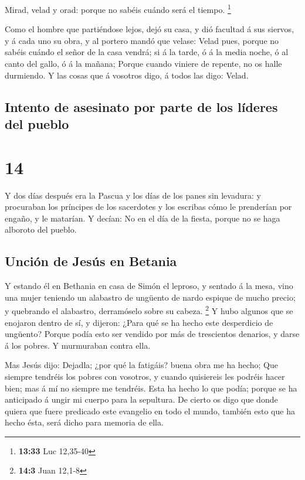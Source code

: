  Mirad, velad y orad: porque no sabéis cuándo será el
tiempo. \footnote{\textbf{13:33} Luc 12,35-40}

 Como el hombre que partiéndose lejos, dejó su casa, y
dió facultad á sus siervos, y á cada uno su obra, y al portero mandó que
velase:  Velad pues, porque no sabéis cuándo el señor de
la casa vendrá; si á la tarde, ó á la media noche, ó al canto del gallo,
ó á la mañana;  Porque cuando viniere de repente, no os
halle durmiendo.  Y las cosas que á vosotros digo, á
todos las digo: Velad.

\hypertarget{intento-de-asesinato-por-parte-de-los-luxedderes-del-pueblo}{%
\subsection{Intento de asesinato por parte de los líderes del
pueblo}\label{intento-de-asesinato-por-parte-de-los-luxedderes-del-pueblo}}

\hypertarget{section-13}{%
\section{14}\label{section-13}}

 Y dos días después era la Pascua y los días de los panes
sin levadura: y procuraban los príncipes de los sacerdotes y los
escribas cómo le prenderían por engaño, y le matarían.  Y
decían: No en el día de la fiesta, porque no se haga alboroto del
pueblo.

\hypertarget{unciuxf3n-de-jesuxfas-en-betania}{%
\subsection{Unción de Jesús en
Betania}\label{unciuxf3n-de-jesuxfas-en-betania}}

 Y estando él en Bethania en casa de Simón el leproso, y
sentado á la mesa, vino una mujer teniendo un alabastro de ungüento de
nardo espique de mucho precio; y quebrando el alabastro, derramóselo
sobre su cabeza. \footnote{\textbf{14:3} Juan 12,1-8}  Y
hubo algunos que se enojaron dentro de sí, y dijeron: ¿Para qué se ha
hecho este desperdicio de ungüento?  Porque podía esto ser
vendido por más de trescientos denarios, y darse á los pobres. Y
murmuraban contra ella.

 Mas Jesús dijo: Dejadla; ¿por qué la fatigáis? buena obra
me ha hecho;  Que siempre tendréis los pobres con
vosotros, y cuando quisiereis les podréis hacer bien; mas á mí no
siempre me tendréis.  Esta ha hecho lo que podía; porque
se ha anticipado á ungir mi cuerpo para la sepultura.  De
cierto os digo que donde quiera que fuere predicado este evangelio en
todo el mundo, también esto que ha hecho ésta, será dicho para memoria
de ella.

